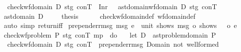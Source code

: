 \begin{isabellebody}
\ \ {\isachardoublequoteopen}check{\isacharunderscore}{\kern0pt}wf{\isacharunderscore}{\kern0pt}domain\ D\ stg\ conT\ {\isacharequal}{\kern0pt}\ Inr\ {\isacharparenleft}{\kern0pt}{\isacharparenright}{\kern0pt}\ {\isasymlongleftrightarrow}\ ast{\isacharunderscore}{\kern0pt}domain{\isachardot}{\kern0pt}wf{\isacharunderscore}{\kern0pt}domain{\isacharprime}{\kern0pt}\ D\ stg\ conT{\isachardoublequoteclose}\isanewline
%
\isadelimproof
%
\endisadelimproof
%
\isatagproof
{}\isamarkupfalse%
\ {\isacharminus}{\kern0pt}\isanewline
\ \ \isamarkupfalse%
\ ast{\isacharunderscore}{\kern0pt}domain\ D\ \isakeywordONE{{\isachardot}{\kern0pt}}\isamarkupfalse%
\isanewline
\ \ \isamarkupfalse%
\ {\isacharquery}{\kern0pt}thesis\isanewline
\ \ \ \ \isamarkupfalse%
\ check{\isacharunderscore}{\kern0pt}wf{\isacharunderscore}{\kern0pt}domain{\isacharunderscore}{\kern0pt}def\ wf{\isacharunderscore}{\kern0pt}domain{\isacharprime}{\kern0pt}{\isacharunderscore}{\kern0pt}def\ \isamarkupfalse%
\ {\isacharparenleft}{\kern0pt}auto\ simp{\isacharcolon}{\kern0pt}\ return{\isacharunderscore}{\kern0pt}iff{\isacharparenright}{\kern0pt}\isanewline
{}\isamarkupfalse%
%
\endisatagproof
{\isafoldproof}%
%
\isadelimproof
\isanewline
%
\endisadelimproof
\isanewline
{}\isamarkupfalse%
\ {\isachardoublequoteopen}prepend{\isacharunderscore}{\kern0pt}err{\isacharunderscore}{\kern0pt}msg\ msg\ e\ {\isasymequiv}\ {\isasymlambda}{\isacharunderscore}{\kern0pt}{\isacharcolon}{\kern0pt}{\isacharcolon}{\kern0pt}unit{\isachardot}{\kern0pt}\ shows\ msg\ o\ shows\ {\isacharprime}{\kern0pt}{\isacharprime}{\kern0pt}{\isacharcolon}{\kern0pt}\ {\isacharprime}{\kern0pt}{\isacharprime}{\kern0pt}\ o\ e\ {\isacharparenleft}{\kern0pt}{\isacharparenright}{\kern0pt}{\isachardoublequoteclose}\isanewline
\isanewline
{}\isamarkupfalse%
\ {\isachardoublequoteopen}check{\isacharunderscore}{\kern0pt}wf{\isacharunderscore}{\kern0pt}problem\ P\ stg\ conT\ mp\ {\isasymequiv}\ do\ {\isacharbraceleft}{\kern0pt}\isanewline
\ \ let\ D\ {\isacharequal}{\kern0pt}\ ast{\isacharunderscore}{\kern0pt}problem{\isachardot}{\kern0pt}domain\ P{\isacharsemicolon}{\kern0pt}\isanewline
\ \ check{\isacharunderscore}{\kern0pt}wf{\isacharunderscore}{\kern0pt}domain\ D\ stg\ conT\ {\isacharless}{\kern0pt}{\isacharplus}{\kern0pt}{\isacharquery}{\kern0pt}\ prepend{\isacharunderscore}{\kern0pt}err{\isacharunderscore}{\kern0pt}msg\ {\isacharprime}{\kern0pt}{\isacharprime}{\kern0pt}Domain\ not\ well{\isacharminus}{\kern0pt}formed{\isacharprime}{\kern0pt}{\isacharprime}{\kern0pt}{\isacharsemicolon}{\kern0pt}\isanewline

\end{isabellebody}
